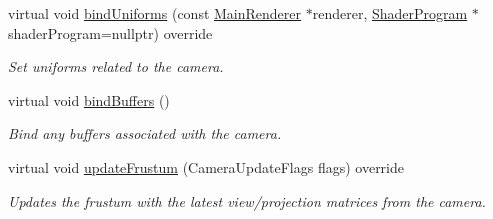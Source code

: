 \begin{Indent}
\begin{DoxyCompactItemize}
virtual void \mbox{\hyperlink{classrev_1_1_camera_aacdb899dc9745568b6c45240fd114e7d}{bind\+Uniforms}} (const \mbox{\hyperlink{classrev_1_1_main_renderer}{Main\+Renderer}} $\ast$renderer, \mbox{\hyperlink{classrev_1_1_shader_program}{Shader\+Program}} $\ast$shader\+Program=nullptr) override
\begin{DoxyCompactList}\small\item\em Set uniforms related to the camera. \end{DoxyCompactList}\item 
\mbox{\label{classrev_1_1_camera_acd1e9013d25142554e044b547fb7b79f}} 
virtual void \mbox{\hyperlink{classrev_1_1_camera_acd1e9013d25142554e044b547fb7b79f}{bind\+Buffers}} ()
\begin{DoxyCompactList}\small\item\em Bind any buffers associated with the camera. \end{DoxyCompactList}\item 
\mbox{\label{classrev_1_1_camera_a40f73fbbc0852f553b3101126a47ae80}} 
virtual void \mbox{\hyperlink{classrev_1_1_camera_a40f73fbbc0852f553b3101126a47ae80}{update\+Frustum}} (Camera\+Update\+Flags flags) override
\begin{DoxyCompactList}\small\item\em Updates the frustum with the latest view/projection matrices from the camera. \end{DoxyCompactList}\end{DoxyCompactItemize}
\end{Indent}
